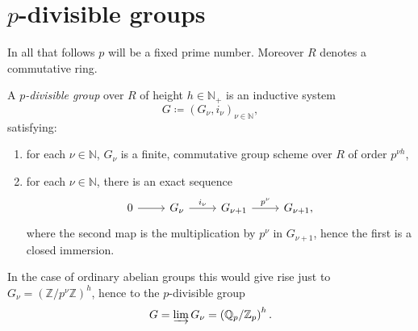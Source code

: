 \documentclass[../Main]{subfiles}
\begin{document}
\section{$p$-divisible groups}
In all that follows $p$ will be a fixed prime number.
Moreover $R$ denotes a commutative ring.

\begin{defn}
	A {\em $p$-divisible group} over $R$ of height $h \in \mathbb{N}_+$ is an inductive system
	\begin{equation*}
	G \coloneqq \left(G_\nu, i_\nu\right)_{\nu \in \mathbb{N}}
	,\end{equation*} 
	satisfying:
	\begin{enumerate}
		\item for each $\nu \in \mathbb{N}$, $G_\nu$ is a finite, commutative group scheme over $R$
			of order $p^{\nu h}$,
		\item for each $\nu \in \mathbb{N}$, there is an exact sequence
			\begin{equation*}
			\begin{tikzcd}
				0 \arrow[r, "", rightarrow] &
				G_\nu \arrow[r, "i_\nu", rightarrow] &
				G_{\nu + 1} \arrow[r, "p^\nu", rightarrow] &
				G_{\nu + 1} 
			,\end{tikzcd}
			\end{equation*}
			where the second map is the multiplication by $p^\nu$ in $G_{\nu + 1}$,
			hence the first is a closed immersion.
	\end{enumerate}
\end{defn}

\begin{rem}[]
	In the case of ordinary abelian groups this would give rise just to 
	$G_\nu = \left( \mathbb{Z}/p^\nu\mathbb{Z} \right)^h$, hence to the $p$-divisible group
	\begin{equation*}
		G = \varinjlim G_\nu = \left( \mathbb{Q}_p / \mathbb{Z}_p \right)^h
	.\end{equation*} 
\end{rem}
\end{document}
